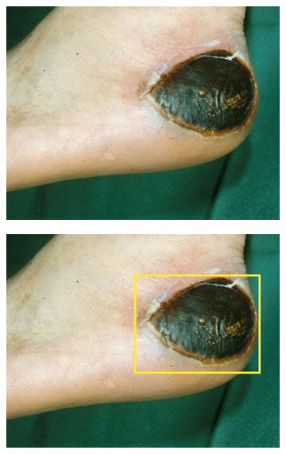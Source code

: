 \begin{figure}[H]
	\centering
	  \begin{subfigure}{0.3\textwidth}
		\centering{}
		\includegraphics[width=\textwidth]{gambar/gambar-3_2(b).jpg}
		\caption{}
	  \end{subfigure}  
	  \begin{subfigure}{0.3\textwidth}
		\centering{}
		\includegraphics[width=\textwidth]{gambar/rectangle.png}
		\caption{}
	  \end{subfigure}
      \begin{subfigure}{0.3\textwidth}
		\centering{}

\end{subfigure}
\end{figure}
